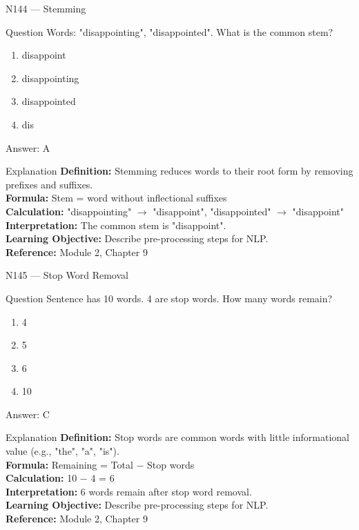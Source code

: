 \documentclass[aspectratio=169,8pt]{beamer}
\begin{document}
	\begin{frame}{N144 --- Stemming}
		\begin{block}{Question}
			Words: "disappointing", "disappointed". What is the common stem?
			\begin{enumerate}
				\item disappoint
				\item disappointing
				\item disappointed
				\item dis
			\end{enumerate}
		\end{block}
		\begin{exampleblock}{Answer: A}\end{exampleblock}
		\begin{block}{Explanation}
			\textbf{Definition:} Stemming reduces words to their root form by removing prefixes and suffixes.\\
			\textbf{Formula:} Stem = word without inflectional suffixes\\
			\textbf{Calculation:} "disappointing" $\rightarrow$ "disappoint", "disappointed" $\rightarrow$ "disappoint"\\
			\textbf{Interpretation:} The common stem is "disappoint".\\
			\textbf{Learning Objective:} Describe pre-processing steps for NLP.\\
			\textbf{Reference:} Module 2, Chapter 9
		\end{block}
	\end{frame}
	
	\begin{frame}{N145 --- Stop Word Removal}
		\begin{block}{Question}
			Sentence has 10 words. 4 are stop words. How many words remain?
			\begin{enumerate}
				\item 4
				\item 5
				\item 6
				\item 10
			\end{enumerate}
		\end{block}
		\begin{exampleblock}{Answer: C}\end{exampleblock}
		\begin{block}{Explanation}
			\textbf{Definition:} Stop words are common words with little informational value (e.g., "the", "a", "is").\\
			\textbf{Formula:} Remaining = Total $-$ Stop words\\
			\textbf{Calculation:} 10 $-$ 4 = 6\\
			\textbf{Interpretation:} 6 words remain after stop word removal.\\
			\textbf{Learning Objective:} Describe pre-processing steps for NLP.\\
			\textbf{Reference:} Module 2, Chapter 9
		\end{block}
	\end{frame}
	
\end{document}
